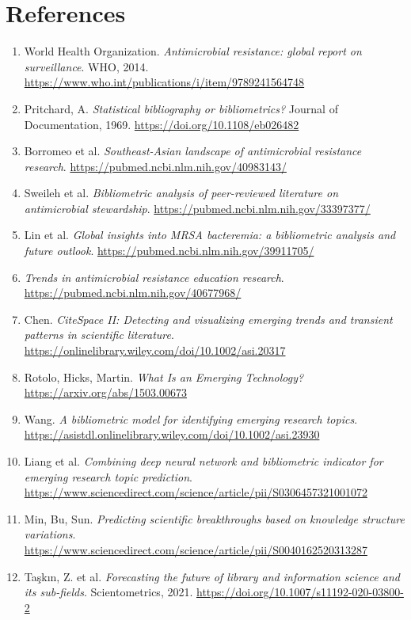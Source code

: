 \section*{References}

\begin{enumerate}
\item World Health Organization. \emph{Antimicrobial resistance: global report on surveillance}. WHO, 2014. \url{https://www.who.int/publications/i/item/9789241564748}
\item Pritchard, A. \emph{Statistical bibliography or bibliometrics?} Journal of Documentation, 1969. \url{https://doi.org/10.1108/eb026482}
\item Borromeo et al. \emph{Southeast-Asian landscape of antimicrobial resistance research}. \url{https://pubmed.ncbi.nlm.nih.gov/40983143/}
\item Sweileh et al. \emph{Bibliometric analysis of peer-reviewed literature on antimicrobial stewardship}. \url{https://pubmed.ncbi.nlm.nih.gov/33397377/}
\item Lin et al. \emph{Global insights into MRSA bacteremia: a bibliometric analysis and future outlook}. \url{https://pubmed.ncbi.nlm.nih.gov/39911705/}
\item \emph{Trends in antimicrobial resistance education research}. \url{https://pubmed.ncbi.nlm.nih.gov/40677968/}
\item Chen. \emph{CiteSpace II: Detecting and visualizing emerging trends and transient patterns in scientific literature}. \url{https://onlinelibrary.wiley.com/doi/10.1002/asi.20317}
\item Rotolo, Hicks, Martin. \emph{What Is an Emerging Technology?} \url{https://arxiv.org/abs/1503.00673}
\item Wang. \emph{A bibliometric model for identifying emerging research topics}. \url{https://asistdl.onlinelibrary.wiley.com/doi/10.1002/asi.23930}
\item Liang et al. \emph{Combining deep neural network and bibliometric indicator for emerging research topic prediction}. \url{https://www.sciencedirect.com/science/article/pii/S0306457321001072}
\item Min, Bu, Sun. \emph{Predicting scientific breakthroughs based on knowledge structure variations}. \url{https://www.sciencedirect.com/science/article/pii/S0040162520313287}
\item Ta\c{s}k{\i}n, Z. et al. \emph{Forecasting the future of library and information science and its sub-fields}. Scientometrics, 2021. \url{https://doi.org/10.1007/s11192-020-03800-2}

\end{enumerate}
